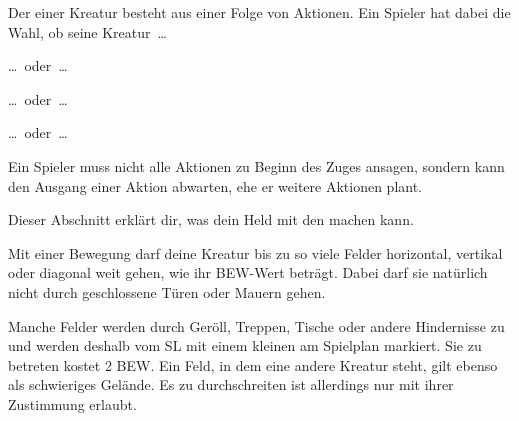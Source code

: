 {		Der  einer Kreatur besteht aus einer Folge von Aktionen. Ein Spieler hat dabei die Wahl, ob seine Kreatur~\ldots


		{\centering\ldots~oder~\ldots}


		{\centering\ldots~oder~\ldots}


		{\centering\ldots~oder~\ldots}


		\noindent
		Ein Spieler muss nicht alle Aktionen zu Beginn des Zuges ansagen, sondern kann den Ausgang einer Aktion abwarten, ehe er weitere Aktionen plant.



		\noindent
		Dieser Abschnitt erklärt dir, was dein Held mit den  machen kann.

			Mit einer Bewegung darf deine Kreatur bis zu so viele Felder horizontal, vertikal oder diagonal weit gehen, wie ihr BEW-Wert beträgt. Dabei darf sie natürlich nicht durch geschlossene Türen oder Mauern gehen.

			Manche Felder werden durch Geröll, Treppen, Tische oder andere Hindernisse zu  und werden deshalb vom SL mit einem kleinen  am Spielplan markiert. Sie zu betreten kostet 2 BEW. Ein Feld, in dem eine andere Kreatur steht, gilt ebenso als schwieriges Gelände. Es zu durchschreiten ist allerdings nur mit ihrer Zustimmung erlaubt.

}
